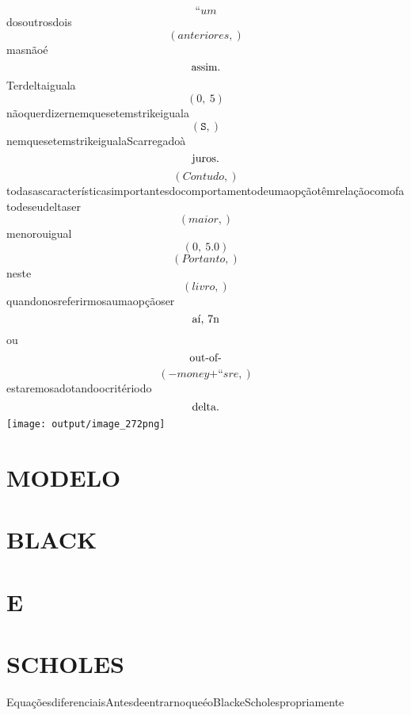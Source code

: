 \documentclass{article}
\begin{document}
\begin{equation}
“um
\end{equation}dosoutrosdois\begin{equation}
\left( anteriores,\right)
\end{equation}masnãoé\begin{equation}
$assim.$
\end{equation}Terdeltaiguala\begin{equation}
\left( 0, \  5\right)
\end{equation}nãoquerdizernemquesetemstrikeiguala\begin{equation}
\left( \mathtt{\text{S}},\right)
\end{equation}nemquesetemstrikeigualaScarregadoà\begin{equation}
$juros.$
\end{equation}\begin{equation}
\left( Contudo,\right)
\end{equation}todasascaracterísticasimportantesdocomportamentodeumaopçãotêmrelaçãocomofatodeseudeltaser\begin{equation}
\left( maior,\right)
\end{equation}menorouigual\begin{equation}
\left( 0, \  5.0\right)
\end{equation}\begin{equation}
\left( Portanto,\right)
\end{equation}neste\begin{equation}
\left( livro,\right)
\end{equation}quandonosreferirmosaumaopçãoser\begin{equation}
$aí, 7n$
\end{equation}ou\begin{equation}
$out-of-$
\end{equation}\begin{equation}
\left( - money + “sre,\right)
\end{equation}estaremosadotandoocritériodo\begin{equation}
$delta.$
\end{equation}\texttt{[image: output/image\_272png]}\section{MODELO}\section{BLACK}\section{E}\section{SCHOLES}EquaçõesdiferenciaisAntesdeentrarnoqueéoBlackeScholespropriamente\begin{equation}

\end{equation}
\end{document}
